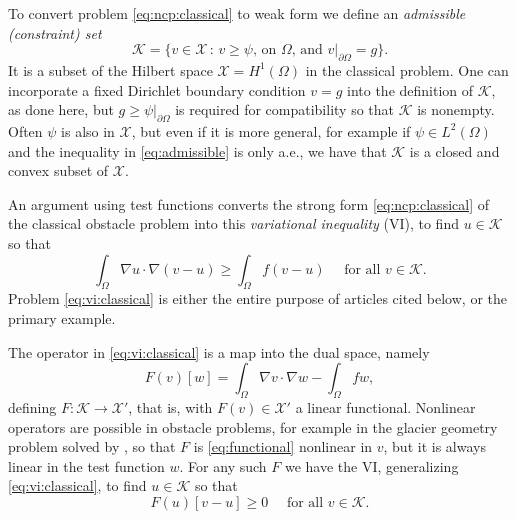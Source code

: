 \documentclass[11pt]{article}
\newcommand{\cK}{\ensuremath{\mathcal{K}}}
\newcommand{\cX}{\ensuremath{\mathcal{X}}}
\begin{document}
To convert problem \eqref{eq:ncp:classical} to weak form we define an \emph{admissible (constraint) set}
\begin{equation} \label{eq:admissible}
\cK = \{v \in \cX \,:\, v \ge \psi \text{, on $\Omega$, and } v|_{\partial \Omega} = g\}.
\end{equation}
It is a subset of the Hilbert space $\cX = H^1(\Omega)$ in the classical problem.  One can incorporate a fixed Dirichlet boundary condition $v=g$ into the definition of $\cK$, as done here, but $g\ge \psi|_{\partial\Omega}$ is required for compatibility so that $\cK$ is nonempty.  Often $\psi$ is also in $\cX$, but even if it is more general, for example if $\psi\in L^2(\Omega)$ and the inequality in \eqref{eq:admissible} is only a.e., we have that $\cK$ is a closed and convex subset of $\cX$.

An argument using test functions \cite{KinderlehrerStampacchia1980} converts the strong form \eqref{eq:ncp:classical} of the classical obstacle problem into this \emph{variational inequality} (VI), to find $u\in\cK$ so that
\begin{equation}
\int_\Omega \nabla u \cdot \nabla(v - u) \ge \int_\Omega f(v - u) \quad \text{ for all } v \in \cK. \label{eq:vi:classical}
\end{equation}
Problem \eqref{eq:vi:classical} is either the entire purpose of articles cited below, or the primary example.

The operator in \eqref{eq:vi:classical} is a map into the dual space, namely
\begin{equation}
F(v)[w] = \int_\Omega \nabla v \cdot \nabla w - \int_\Omega f w, \label{eq:functional}
\end{equation}
defining $F:\cK \to \cX'$, that is, with $F(v)\in \cX'$ a linear functional.  Nonlinear operators are possible in obstacle problems, for example in the glacier geometry problem solved by \cite{FochesattoBueler2025}, so that $F$ is \eqref{eq:functional} nonlinear in $v$, but it is always linear in the test function $w$.  For any such $F$ we have the VI, generalizing \eqref{eq:vi:classical}, to find $u\in\cK$ so that
\begin{equation}
F(u)[v-u] \ge 0 \quad \text{ for all } v \in \cK. \label{eq:vi}
\end{equation}
\end{document}
